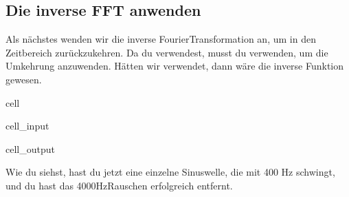 \documentclass[letterpaper,10pt,english]{jupyterBook}
\begin{document}
\subsection{Die inverse FFT anwenden}
\label{\detokenize{content/T_Spektralanalyse_Audio:die-inverse-fft-anwenden}}
\sphinxAtStartPar
Als nächstes wenden wir die inverse Fourier\sphinxhyphen{}Transformation an, um in den Zeitbereich zurückzukehren. Da du  verwendest, musst du  verwenden, um die Umkehrung anzuwenden. Hätten wir  verwendet, dann wäre die inverse Funktion  gewesen.

\begin{sphinxuseclass}{cell}\begin{sphinxVerbatimInput}

\begin{sphinxuseclass}{cell_input}
\begin{sphinxVerbatim}[commandchars=\\\{\}]
   

  
\PYG{p}{[}\PYG{p}{]} 
\end{sphinxVerbatim}

\end{sphinxuseclass}\end{sphinxVerbatimInput}
\begin{sphinxVerbatimOutput}

\begin{sphinxuseclass}{cell_output}
\noindent{}

\end{sphinxuseclass}\end{sphinxVerbatimOutput}

\end{sphinxuseclass}
\sphinxAtStartPar
Wie du siehst, hast du jetzt eine einzelne Sinuswelle, die mit 400 Hz schwingt, und du hast das 4000\sphinxhyphen{}Hz\sphinxhyphen{}Rauschen erfolgreich entfernt.
\end{document}
